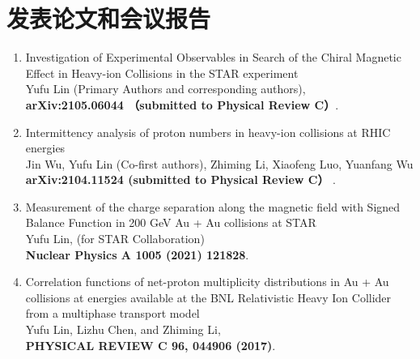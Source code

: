 \chapter*{发表论文和会议报告}

\setcounter{section}{0}
\setcounter{figure}{0}
\setcounter{table}{0}
\setcounter{equation}{0}

\begin{enumerate}



\item    Investigation of Experimental Observables in Search of the Chiral Magnetic Effect in Heavy-ion Collisions in the STAR experiment \\
 {\color{red} Yufu Lin} (Primary Authors and corresponding authors), \\
\textbf{arXiv:2105.06044 （submitted to Physical Review C）}.\\


\item    Intermittency analysis of proton numbers in heavy-ion collisions at RHIC energies\\
 Jin Wu, {\color{red} Yufu Lin (Co-first authors)}, Zhiming Li, Xiaofeng Luo, Yuanfang Wu \\
\textbf{arXiv:2104.11524 (submitted to Physical Review C） }.\\


\item    Measurement of the charge separation along the magnetic field with Signed Balance Function in 200 GeV Au + Au collisions at STAR\\
 {\color{red} Yufu Lin}, (for STAR Collaboration)\\
\textbf{Nuclear Physics A 1005 (2021) 121828}.\\

\item   Correlation functions of net-proton multiplicity distributions in Au + Au collisions at energies available at the BNL Relativistic Heavy Ion Collider from a multiphase transport model\\
 {\color{red} Yufu Lin}, Lizhu Chen,  and Zhiming Li,\\
\textbf{PHYSICAL REVIEW C 96, 044906 (2017)}.\\



\end{enumerate}
